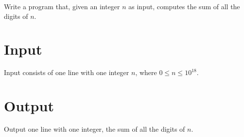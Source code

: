 
Write a program that, given an integer $n$ as input, computes the sum of all the digits of $n$.

\section*{Input}
Input consists of one line with one integer $n$, where $0 \leq n \leq 10^{18}$.

\section*{Output}
Output one line with one integer, the sum of all the digits of $n$.
